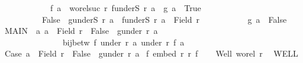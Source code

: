 \begin{isabellebody}
\ \ \ \ \ \ \ \ \ \ {\isasymlongrightarrow}\ f\ a\ {\isacharequal}{\kern0pt}\ wo{\isacharunderscore}{\kern0pt}rel{\isachardot}{\kern0pt}suc\ r{\isacharprime}{\kern0pt}\ {\isacharparenleft}{\kern0pt}f{\isacharbackquote}{\kern0pt}{\isacharparenleft}{\kern0pt}underS\ r\ a{\isacharparenright}{\kern0pt}{\isacharparenright}{\kern0pt}\ {\isasymand}\ g\ a\ {\isacharequal}{\kern0pt}\ True{\isacharparenright}{\kern0pt}\isanewline
\ \ \ \ \ \ \ \ \ {\isasymand}\isanewline
\ \ \ \ \ \ \ \ \ {\isacharparenleft}{\kern0pt}{\isasymnot}{\isacharparenleft}{\kern0pt}False\ {\isasymnotin}\ {\isacharparenleft}{\kern0pt}g{\isacharbackquote}{\kern0pt}{\isacharparenleft}{\kern0pt}underS\ r\ a{\isacharparenright}{\kern0pt}{\isacharparenright}{\kern0pt}\ {\isasymand}\ f{\isacharbackquote}{\kern0pt}{\isacharparenleft}{\kern0pt}underS\ r\ a{\isacharparenright}{\kern0pt}\ {\isasymnoteq}\ Field\ r{\isacharprime}{\kern0pt}{\isacharparenright}{\kern0pt}\isanewline
\ \ \ \ \ \ \ \ \ \ {\isasymlongrightarrow}\ g\ a\ {\isacharequal}{\kern0pt}\ False{\isacharparenright}{\kern0pt}{\isachardoublequoteclose}\ \isanewline
MAIN{}{\isacharcolon}{\kern0pt}\ {\isachardoublequoteopen}{\isasymAnd}\ a{\isachardot}{\kern0pt}\ a\ {\isasymin}\ Field\ r\ {\isasymand}\ False\ {\isasymnotin}\ g{\isacharbackquote}{\kern0pt}{\isacharparenleft}{\kern0pt}under\ r\ a{\isacharparenright}{\kern0pt}\ {\isasymlongrightarrow}\isanewline
\ \ \ \ \ \ \ \ \ \ \ \ \ \ bij{\isacharunderscore}{\kern0pt}betw\ f\ {\isacharparenleft}{\kern0pt}under\ r\ a{\isacharparenright}{\kern0pt}\ {\isacharparenleft}{\kern0pt}under\ r{\isacharprime}{\kern0pt}\ {\isacharparenleft}{\kern0pt}f\ a{\isacharparenright}{\kern0pt}{\isacharparenright}{\kern0pt}{\isachardoublequoteclose}\ \isanewline
Case{\isacharcolon}{\kern0pt}\ {\isachardoublequoteopen}a\ {\isasymin}\ Field\ r\ {\isasymand}\ False\ {\isasymin}\ g{\isacharbackquote}{\kern0pt}{\isacharparenleft}{\kern0pt}under\ r\ a{\isacharparenright}{\kern0pt}{\isachardoublequoteclose}\isanewline
{}\ {\isachardoublequoteopen}{\isasymexists}f{\isacharprime}{\kern0pt}{\isachardot}{\kern0pt}\ embed\ r{\isacharprime}{\kern0pt}\ r\ f{\isacharprime}{\kern0pt}{\isachardoublequoteclose}\isanewline
%
\isadelimproof
%
\endisadelimproof
%
\isatagproof
{}\isamarkupfalse%
{\isacharminus}{\kern0pt}\isanewline
\ \ \isamarkupfalse%
\ Well{\isacharcolon}{\kern0pt}\ {\isachardoublequoteopen}wo{\isacharunderscore}{\kern0pt}rel\ r{\isachardoublequoteclose}\ \isamarkupfalse%
\ WELL\ \isamarkupfalse%

\end{isabellebody}
